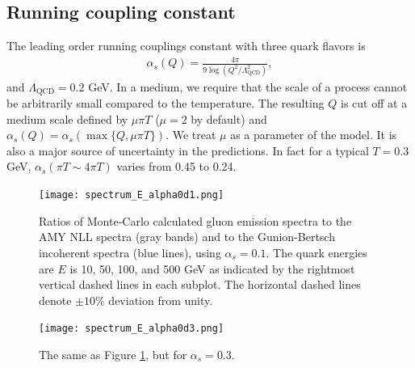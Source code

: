 \documentclass[aps, prc, reprint, amsmath, groupedaddress, nofootinbib]{revtex4-1}
\begin{document}
\begin{appendices}
\section{Running coupling constant}\label{app:alphas}
The leading order running couplings constant with three quark flavors is
\begin{eqnarray}
\alpha_s(Q) = \frac{4\pi}{9\log(Q^2/\Lambda_{\textrm{QCD}}^2)},
\end{eqnarray}
and $\Lambda_{\textrm{QCD}} = 0.2$ GeV. In a medium, we require that the scale of a process cannot be arbitrarily small compared to the temperature. The resulting $Q$ is cut off at a medium scale defined by $\mu\pi T$ ($\mu=2$ by default) and $\alpha_s(Q) = \alpha_s(\max\{Q,\mu\pi T\})$. We treat $\mu$ as a parameter of the model. It is also a major source of uncertainty in the predictions. In fact for a typical $T=0.3$ GeV, $\alpha_s(\pi T \sim 4\pi T)$ varies from 0.45 to 0.24.

\begin{figure}
\texttt{[image: spectrum\_E\_alpha0d1.png]}
\caption{Ratios of Monte-Carlo calculated gluon emission spectra to the AMY NLL spectra (gray bands) and to the Gunion-Bertsch incoherent spectra (blue lines), using $\alpha_s = 0.1$. The quark energies are $E$ is 10, 50, 100, and 500 GeV as indicated by the rightmost vertical dashed lines in each subplot. The horizontal dashed lines denote $\pm 10\%$ deviation from unity.}
\label{fig:spectra-alphas=0.1}
\end{figure}


\begin{figure}
\texttt{[image: spectrum\_E\_alpha0d3.png]}
\caption{The same as Figure \ref{fig:spectra-alphas=0.1}, but for $\alpha_s = 0.3$.}
\label{fig:spectra-alphas=0.3}
\end{figure}


\end{appendices}
\end{document}
